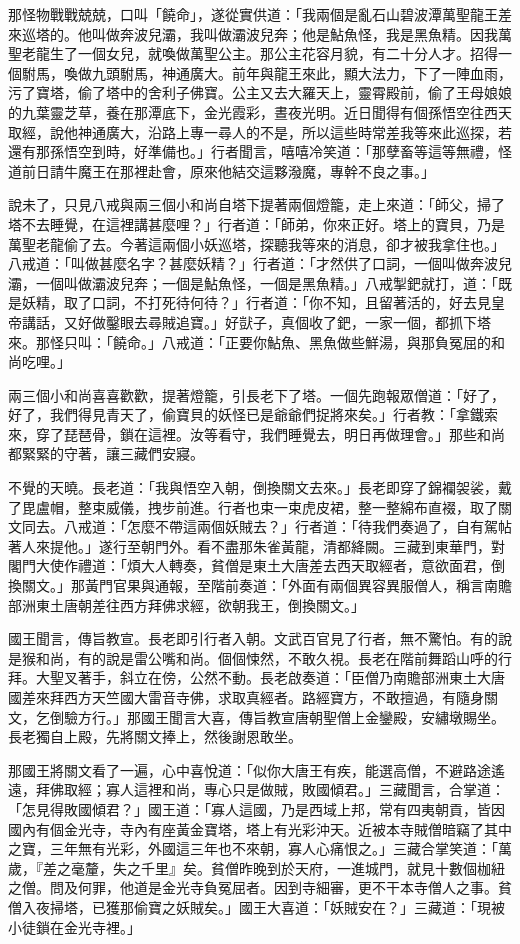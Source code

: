 那怪物戰戰兢兢，口叫「饒命」，遂從實供道：「我兩個是亂石山碧波潭萬聖龍王差來巡塔的。他叫做奔波兒灞，我叫做灞波兒奔；他是鮎魚怪，我是黑魚精。因我萬聖老龍生了一個女兒，就喚做萬聖公主。那公主花容月貌，有二十分人才。招得一個駙馬，喚做九頭駙馬，神通廣大。前年與龍王來此，顯大法力，下了一陣血雨，污了寶塔，偷了塔中的舍利子佛寶。公主又去大羅天上，靈霄殿前，偷了王母娘娘的九葉靈芝草，養在那潭底下，金光霞彩，晝夜光明。近日聞得有個孫悟空往西天取經，說他神通廣大，沿路上專一尋人的不是，所以這些時常差我等來此巡探，若還有那孫悟空到時，好準備也。」行者聞言，嘻嘻冷笑道：「那孽畜等這等無禮，怪道前日請牛魔王在那裡赴會，原來他結交這夥潑魔，專幹不良之事。」

說未了，只見八戒與兩三個小和尚自塔下提著兩個燈籠，走上來道：「師父，掃了塔不去睡覺，在這裡講甚麼哩？」行者道：「師弟，你來正好。塔上的寶貝，乃是萬聖老龍偷了去。今著這兩個小妖巡塔，探聽我等來的消息，卻才被我拿住也。」八戒道：「叫做甚麼名字？甚麼妖精？」行者道：「才然供了口詞，一個叫做奔波兒灞，一個叫做灞波兒奔；一個是鮎魚怪，一個是黑魚精。」八戒掣鈀就打，道：「既是妖精，取了口詞，不打死待何待？」行者道：「你不知，且留著活的，好去見皇帝講話，又好做鑿眼去尋賊追寶。」好獃子，真個收了鈀，一家一個，都抓下塔來。那怪只叫：「饒命。」八戒道：「正要你鮎魚、黑魚做些鮮湯，與那負冤屈的和尚吃哩。」

兩三個小和尚喜喜歡歡，提著燈籠，引長老下了塔。一個先跑報眾僧道：「好了，好了，我們得見青天了，偷寶貝的妖怪已是爺爺們捉將來矣。」行者教：「拿鐵索來，穿了琵琶骨，鎖在這裡。汝等看守，我們睡覺去，明日再做理會。」那些和尚都緊緊的守著，讓三藏們安寢。

不覺的天曉。長老道：「我與悟空入朝，倒換關文去來。」長老即穿了錦襴袈裟，戴了毘盧帽，整束威儀，拽步前進。行者也束一束虎皮裙，整一整綿布直裰，取了關文同去。八戒道：「怎麼不帶這兩個妖賊去？」行者道：「待我們奏過了，自有駕帖著人來提他。」遂行至朝門外。看不盡那朱雀黃龍，清都絳闕。三藏到東華門，對閣門大使作禮道：「煩大人轉奏，貧僧是東土大唐差去西天取經者，意欲面君，倒換關文。」那黃門官果與通報，至階前奏道：「外面有兩個異容異服僧人，稱言南贍部洲東土唐朝差往西方拜佛求經，欲朝我王，倒換關文。」

國王聞言，傳旨教宣。長老即引行者入朝。文武百官見了行者，無不驚怕。有的說是猴和尚，有的說是雷公嘴和尚。個個悚然，不敢久視。長老在階前舞蹈山呼的行拜。大聖叉著手，斜立在傍，公然不動。長老啟奏道：「臣僧乃南贍部洲東土大唐國差來拜西方天竺國大雷音寺佛，求取真經者。路經寶方，不敢擅過，有隨身關文，乞倒驗方行。」那國王聞言大喜，傳旨教宣唐朝聖僧上金鑾殿，安繡墩賜坐。長老獨自上殿，先將關文捧上，然後謝恩敢坐。

那國王將關文看了一遍，心中喜悅道：「似你大唐王有疾，能選高僧，不避路途遙遠，拜佛取經；寡人這裡和尚，專心只是做賊，敗國傾君。」三藏聞言，合掌道：「怎見得敗國傾君？」國王道：「寡人這國，乃是西域上邦，常有四夷朝貢，皆因國內有個金光寺，寺內有座黃金寶塔，塔上有光彩沖天。近被本寺賊僧暗竊了其中之寶，三年無有光彩，外國這三年也不來朝，寡人心痛恨之。」三藏合掌笑道：「萬歲，『差之毫釐，失之千里』矣。貧僧昨晚到於天府，一進城門，就見十數個枷紐之僧。問及何罪，他道是金光寺負冤屈者。因到寺細審，更不干本寺僧人之事。貧僧入夜掃塔，已獲那偷寶之妖賊矣。」國王大喜道：「妖賊安在？」三藏道：「現被小徒鎖在金光寺裡。」

